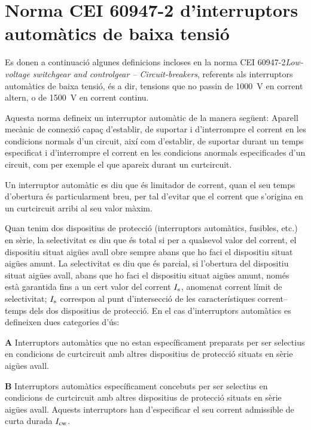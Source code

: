 \section{Norma CEI 60947-2  d'interruptors automàtics  de baixa tensió}


Es donen a continuació algunes definicions incloses en la norma CEI 60947-2\textit{Low-voltage switchgear and controlgear – Circuit-breakers}, referents als interruptors automàtics de baixa tensió, és a dir, tensions que no passin de \qty{1000}{V} en corrent altern, o de \qty{1500}{V} en corrent continu.

Aquesta norma defineix un interruptor automàtic de la manera següent: Aparell mecànic de connexió capaç d'establir, de suportar i d'interrompre el corrent en les condicions normals d'un circuit, així com d'establir, de suportar durant un temps especificat i  d'interrompre el corrent en les condicions anormals especificades d'un circuit, com per exemple el que apareix durant un curtcircuit.

Un interruptor automàtic es diu que és limitador de corrent, quan el seu temps d'obertura és particularment breu, per tal d'evitar que el corrent que s'origina en un curtcircuit arribi al seu valor màxim.

Quan tenim dos  dispositius de protecció (interruptors automàtics, fusibles, etc.) en sèrie, la selectivitat es diu que és total si per a qualsevol valor del corrent, el dispositiu situat aigües avall obre sempre abans que ho faci el dispositiu situat aigües amunt. La selectivitat es diu que és parcial, si l'obertura del dispositiu situat aigües avall, abans que ho faci el dispositiu situat aigües amunt, només està garantida fins a un cert valor del corrent $I_\mathrm{s}$, anomenat corrent límit de selectivitat; $I_\mathrm{s}$ correspon al punt d'intersecció de les característiques corrent--temps dels dos dispositius de protecció. En el cas d'interruptors automàtics es defineixen dues categories d'ús:
 \begin{list}{}
   {\setlength{\labelwidth}{10mm} \setlength{\leftmargin}{10mm} \setlength{\labelsep}{2mm}}
   \item[\textbf{A}] Interruptors automàtics que no estan específicament preparats per ser selectius en condicions de curtcircuit amb altres dispositius de protecció situats en sèrie  aigües avall.
   \item[\textbf{B}] Interruptors automàtics específicament concebuts per ser selectius en condicions de curtcircuit amb altres dispositius de protecció situats en sèrie  aigües avall. Aquests interruptors han d'especificar el seu corrent admissible de curta durada $I_\mathrm{cw}$.
\end{list}

